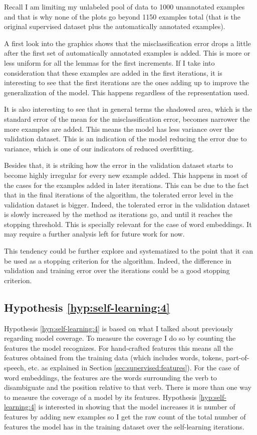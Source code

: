 Recall I am limiting my unlabeled pool of data to 1000 unannotated examples and
that is why none of the plots go beyond 1150 examples total (that is the
original supervised dataset plus the automatically annotated examples).

A first look into the graphics shows that the misclassification error drops a
little after the first set of automatically annotated examples is added. This
is more or less uniform for all the lemmas for the first increments. If I take
into consideration that these examples are added in the first iterations, it is
interesting to see that the first iterations are the ones adding up to improve
the generalization of the model. This happens regardless of the representation
used.

It is also interesting to see that in general terms the shadowed area, which is
the standard error of the mean for the misclassification error, becomes
narrower the more examples are added. This means the model has less variance
over the validation dataset. This is an indication of the model reducing the
error due to variance, which is one of our indicators of reduced overfitting.

Besides that, it is striking how the error in the validation dataset starts to
become highly irregular for every new example added. This happens in most of
the cases for the examples added in later iterations. This can be due to the
fact that in the final iterations of the algorithm, the tolerated error level
in the validation dataset is bigger. Indeed, the tolerated error in the
validation dataset is slowly increased by the method as iterations go, and
until it reaches the stopping threshold. This is specially relevant for the
case of word embeddings. It may require a further analysis left for future work
for now.

This tendency could be further explore and systematized to the point that it
can be used as a stopping criterion for the algorithm. Indeed, the difference
in validation and training error over the iterations could be a good stopping
criterion.

\subsection{Hypothesis \ref{hyp:self-learning:4}}\label{sec:self-learning:hyp:4}

Hypothesis \ref{hyp:self-learning:4} is based on what I talked about previously
regarding model coverage. To measure the coverage I do so by counting the
features the model recognizes. For hand-crafted features this means all the
features obtained from the training data (which includes words, tokens,
part-of-speech, etc. as explained in Section \ref{sec:supervised:features}).
For the case of word embeddings, the features are the words surrounding the
verb to disambiguate and the position relative to that verb. There is more than
one way to measure the coverage of a model by its features. Hypothesis
\ref{hyp:self-learning:4} is interested in showing that the model increases
it is number of features by adding new examples so I get the raw count of the
total number of features the model has in the training dataset over the
self-learning iterations.


